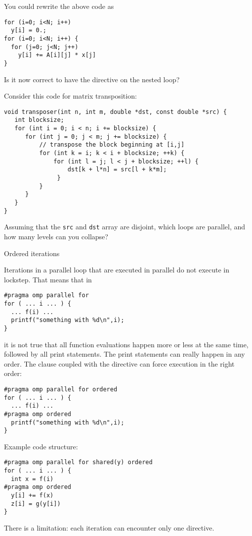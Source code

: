 \begin{exercise}
  You could rewrite the above code as
\begin{lstlisting}
for (i=0; i<N; i++)
  y[i] = 0.;
for (i=0; i<N; i++) {
  for (j=0; j<N; j++)
    y[i] += A[i][j] * x[j]
}
\end{lstlisting}
Is it now correct to have the  directive
on the nested loop?
\end{exercise}

\begin{exercise}
  Consider this code for matrix transposition:
\begin{lstlisting}
void transposer(int n, int m, double *dst, const double *src) {
   int blocksize;
   for (int i = 0; i < n; i += blocksize) {
      for (int j = 0; j < m; j += blocksize) {
          // transpose the block beginning at [i,j]
          for (int k = i; k < i + blocksize; ++k) {
              for (int l = j; l < j + blocksize; ++l) {
                  dst[k + l*n] = src[l + k*m];
               }
          }
      }
   }
}  
\end{lstlisting}
Assuming that the \lstinline{src} and \lstinline{dst}
array are disjoint, which loops are parallel, and how many
levels can you collapse?
\end{exercise}

 {Ordered iterations}
\label{sec:omp-ordered}

Iterations in a parallel loop that are executed in parallel do not
execute in lockstep. That means that in
\begin{lstlisting}
#pragma omp parallel for
for ( ... i ... ) {
  ... f(i) ...
  printf("something with %d\n",i);
}
\end{lstlisting}
it is not true that all function evaluations happen more or less at
the same time, followed by all print statements. The print statements
can really happen in any order. The  clause
coupled with the  directive can
force execution in the right order:
\begin{lstlisting}
#pragma omp parallel for ordered
for ( ... i ... ) {
  ... f(i) ...
#pragma omp ordered
  printf("something with %d\n",i);
}
\end{lstlisting}
Example code structure:
\begin{lstlisting}
#pragma omp parallel for shared(y) ordered
for ( ... i ... ) {
  int x = f(i)
#pragma omp ordered
  y[i] += f(x)
  z[i] = g(y[i])
}
\end{lstlisting}
There is a limitation:
each iteration can encounter only one  directive.

